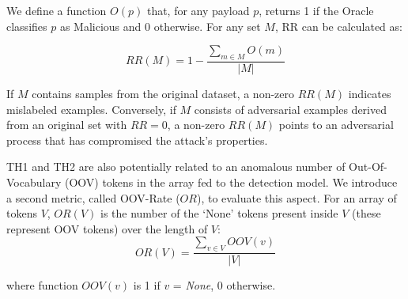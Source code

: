 We define a function $O(p)$ that, for any payload $p$, returns 1 if the Oracle classifies $p$ as Malicious and 0 otherwise. For any set $M$,  RR can be calculated as:

\begin{equation}
    RR(M) = 1 - \frac{\sum_{m \in M}{O(m)}}{|M|}
\end{equation}

If $M$ contains samples from the original dataset, a non-zero $RR(M)$ indicates mislabeled examples. Conversely, if $M$ consists of adversarial examples derived from an original set with $RR=0$, a non-zero $RR(M)$ points to an adversarial process that has compromised the attack's properties.

TH1 and TH2 are also potentially related to an anomalous number of Out-Of-Vocabulary (OOV) tokens in the array fed to the detection model.
We introduce a second metric, called OOV-Rate ($OR$), to evaluate this aspect.
For an array of tokens $V$, $OR(V)$ is the number of the `None' tokens present inside $V$ (these represent OOV tokens) over the length of $V$:
\begin{equation}
    OR(V) = \frac{\sum_{v \in V}{OOV(v)}}{|V|}
\end{equation}

\noindent
where  function $OOV(v)$ is 1 if $v$ = \textit{None}, 0 otherwise.




